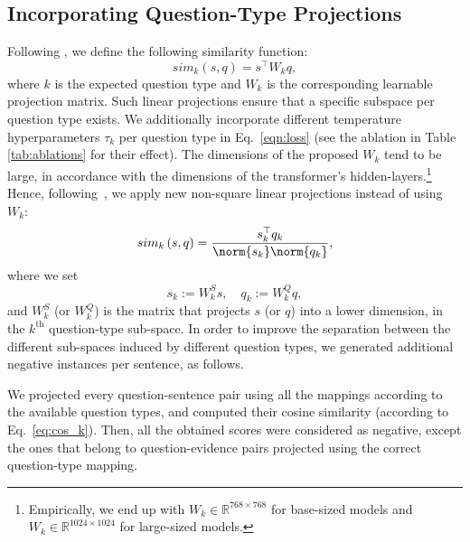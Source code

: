 \subsection{Incorporating Question-Type Projections}
\label{subsec:qt_aware}
Following \citet{iter-etal-2020-pretraining}, we define the following similarity function:
\begin{equation}
sim_k\left(s,q\right)=s^\top W_k q,
\label{eq:first_s}
\end{equation}
where $k$ is the expected question type and $W_k$ is the corresponding learnable projection matrix. Such linear projections ensure that a specific subspace per question type exists. We additionally incorporate different temperature hyperparameters $\tau_k$ per question type in Eq.~\ref{eqn:loss} (see the ablation in Table \ref{tab:ablations} for their effect). %
The dimensions of the proposed $W_k$ tend to be large, in accordance with the dimensions of the transformer's hidden-layers.\footnote{Empirically, we end up with $W_k\in\mathbb{R}^{768\times768}$ for base-sized models and $W_k\in\mathbb{R}^{1024 \times1024}$ for large-sized models.} Hence, following~\citet{barkan-etal-2020-within}, we apply new non-square linear projections instead of using $W_k$:
\begin{equation}
sim_k\left(s,q\right)=\frac{s_k^\top q_k}{\norm{s_k}\norm{q_k}},
\label{eq:cos_k}
\end{equation}
where we set $$s_k{:=}W^S_{k}s,\quad
q_k{:=}W^Q_{k}q,$$ and
$W^S_{k}$ (or $W^Q_{k}$) is the matrix that projects $s$ (or $q$) into a lower dimension, in the $k^\text{th}$ question-type sub-space. 
In order to improve the separation between the different sub-spaces induced by different question types, we generated additional negative instances per sentence, as follows. 

We projected every question-sentence pair using all the mappings according to the available question types, and computed their cosine similarity (according to Eq.~\ref{eq:cos_k}). Then, all the obtained scores were considered as negative, except the ones that belong to question-evidence pairs projected using the correct question-type mapping. %


